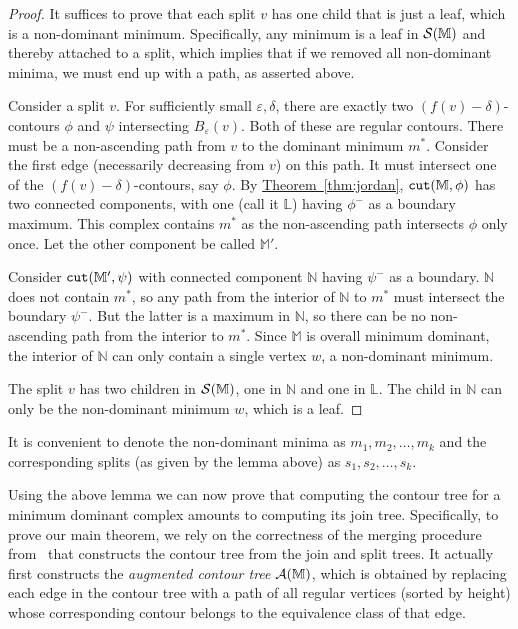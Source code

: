 \documentclass[11pt]{article}
\theoremstyle{definition}
\newcommand{\cA}{{\cal A}}
\newcommand{\cS}{{\cal S}}
\newcommand{\LL}{\mathbb{L}}
\newcommand{\MM}{\mathbb{M}}
\newcommand{\NN}{\mathbb{N}}
\newcommand{\eps}{\varepsilon}
\newcommand{\Thm}[1]{\hyperref[thm:#1]{Theorem~\ref*{thm:#1}}} %
\newcommand{\cut}{{\tt cut}}
\begin{document}
\begin{proof} It suffices to prove that each split $v$ has one child that is just a leaf, which
is a non-dominant minimum.  Specifically, any minimum is a leaf in $\cS(\MM)$ and thereby attached to a split, 
which implies that if we removed all non-dominant minima, we must end up with a path, as asserted above.

Consider a split $v$. For sufficiently small $\eps, \delta$, there are exactly two $(f(v) - \delta)$-contours
$\phi$ and $\psi$ intersecting $B_\eps(v)$. Both of these are regular contours. There must be a non-ascending
path from $v$ to the dominant minimum $m^*$. Consider the first edge (necessarily decreasing from $v$)
on this path. It must intersect one of the $(f(v) - \delta)$-contours, say $\phi$. By \Thm{jordan}, $\cut(\MM,\phi)$ has
two connected components, with one (call it $\LL$) having $\phi^-$ as a boundary maximum. This complex
contains $m^*$ as the non-ascending path intersects $\phi$ only once. Let the other
component be called $\MM'$.

Consider $\cut(\MM',\psi)$ with connected component $\NN$ having $\psi^-$ as a boundary. $\NN$
does not contain $m^*$, so any path from the interior of $\NN$ to $m^*$ must intersect the boundary $\psi^-$.
But the latter is a maximum in $\NN$, so there can be no non-ascending path from the interior to $m^*$.
Since $\MM$ is overall minimum dominant, the interior of $\NN$ can only contain a single vertex $w$, a non-dominant
minimum.

The split $v$ has two children in $\cS(\MM)$, one in $\NN$ and one in $\LL$. The child in $\NN$ can only
be the non-dominant minimum $w$, which is a leaf. 
\end{proof}

It is convenient to denote the non-dominant minima as $m_1, m_2, \ldots, m_k$
and the corresponding splits (as given by the lemma above) as $s_1, s_2, \ldots, s_k$. 

Using the above lemma we can now prove that computing the contour tree for a minimum dominant complex 
amounts to computing its join tree.  Specifically, to prove our main theorem, we rely on the correctness of the
merging procedure from~\cite{csa-cctad-03} that constructs the contour tree from the join and split trees. 
It actually first constructs the \emph{augmented contour tree} $\cA(\MM)$, which is 
obtained by replacing each edge in the contour tree with a path of all regular vertices 
(sorted by height) whose corresponding contour belongs to the equivalence class of that edge.
\end{document}
